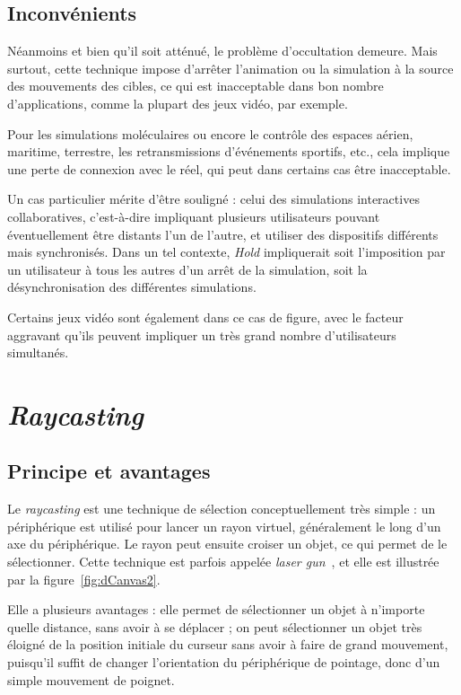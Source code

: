 	\subsection{Inconvénients}
	Néanmoins et bien qu'il soit atténué, le problème d'occultation demeure. Mais surtout, cette technique impose d'arrêter l'animation ou la simulation à la source des mouvements des cibles, ce qui est inacceptable dans bon nombre d'applications, comme la plupart des jeux vidéo, par exemple.
	
	Pour les simulations moléculaires ou encore le contrôle des espaces aérien, maritime, terrestre, les retransmissions d'événements sportifs, etc., cela implique une perte de connexion avec le réel, qui peut dans certains cas être inacceptable.
	
	Un cas particulier mérite d'être souligné : celui des simulations interactives collaboratives, c'est-à-dire impliquant plusieurs utilisateurs pouvant éventuellement être distants l'un de l'autre, et utiliser des dispositifs différents mais synchronisés. Dans un tel contexte, \emph{Hold} impliquerait soit l'imposition par un utilisateur à tous les autres d'un arrêt de la simulation, soit la désynchronisation des différentes simulations.
	
	Certains jeux vidéo sont également dans ce cas de figure, avec le facteur aggravant qu'ils peuvent impliquer un très grand nombre d'utilisateurs simultanés.
	
\section{\emph{Raycasting}}
	\subsection{Principe et avantages}
	Le \emph{raycasting} est une technique de sélection conceptuellement très simple : un périphérique est utilisé pour lancer un rayon virtuel, généralement le long d'un axe du périphérique. Le rayon peut ensuite croiser un objet, ce qui permet de le sélectionner. Cette technique est parfois appelée \emph{laser gun}~\cite{liang1994jdcad}, et elle est illustrée par la figure~\ref{fig:dCanvas2}.
	
	Elle a plusieurs avantages : elle permet de sélectionner un objet à n'importe quelle distance, sans avoir à se déplacer ; on peut sélectionner un objet très éloigné de la position initiale du curseur sans avoir à faire de grand mouvement, puisqu'il suffit de changer l'orientation du périphérique de pointage, donc d'un simple mouvement de poignet.
	
